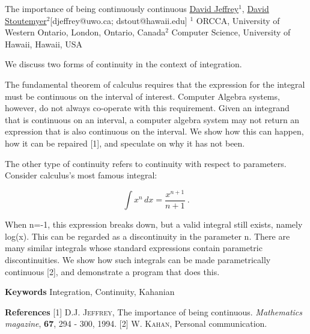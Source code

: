 


\begin{abstract_online}{The importance of being continuously continuous}{%
        \underline{David Jeffrey}$^{1}$, \underline{David Stoutemyer}$^{2}$}{[djeffrey@uwo.ca; dstout@hawaii.edu]
        }{%
        $^1$ ORCCA, University of Western Ontario, London, Ontario, Canada\newline{}$^2$ Computer Science, University of Hawaii, Hawaii, USA}

We discuss two forms of continuity in the context of integration.

The fundamental theorem of calculus requires that the expression for the integral must be continuous on the interval of interest. Computer Algebra systems, however, do not always co-operate with this requirement. Given an integrand that is continuous on an interval, a computer algebra system may not return an expression that is also continuous on the interval. We show how this can happen, how it can be repaired [1], and speculate on why it has not been.

The other type of continuity refers to continuity with respect to parameters. Consider calculus's most famous integral:

\[ \int x^n\, dx = \frac{x^{n+1}}{n+1} \ .\]

When n=-1, this expression breaks down, but a valid integral still exists, namely log(x). This can be regarded as a discontinuity in the parameter n. There are many similar integrals whose standard expressions contain parametric discontinuities. We show how such integrals can be made parametrically continuous [2], and demonstrate a program that does this.

\textbf{Keywords} \newline{} Integration, Continuity, Kahanian

\textbf{References} \newline{}
[1] \textsc{D.J. Jeffrey}, The importance of being continuous. \emph{Mathematics magazine}, \textbf{67}, 294 - 300, 1994. \newline{}
[2] \textsc{W. Kahan}, Personal communication. \newline{}
\end{abstract_online}
